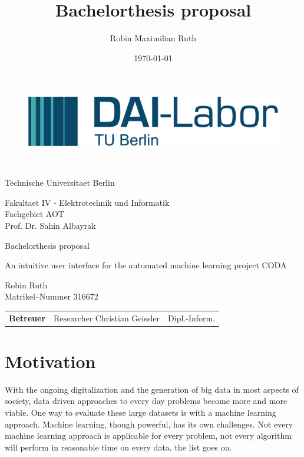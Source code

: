 \documentclass[12pt,a4paper,titlepage,oneside,BCOR1cm]{scrreprt}
\date{\today}
\author{Robin Maximilian Ruth}
\title{Bachelorthesis proposal}
\begin{document}
\thispagestyle{empty}

\begin{figure}[htbp]
\centering
 \begin{minipage}[b]{41 mm}
   \includegraphics[width=40 mm]{./figures/DAI_Logo.png}
 \end{minipage}
\end{figure}

~\vspace{0.5cm}

\begin{center}
\begin{Huge}
Technische Universitaet Berlin\\
\vspace{1mm}
\end{Huge}{\Large Fakultaet IV - Elektrotechnik und Informatik\\
Fachgebiet AOT\\
Prof. Dr. Sahin Albayrak}\\

\vspace{26mm}
\begin{LARGE}
Bachelorthesis proposal\\
\end{LARGE}
\vspace{8mm}
\begin{LARGE}
An intuitive user interface for the automated machine learning project CODA\\
\end{LARGE}
\vspace{3 cm}
Robin Ruth\\
Matrikel--Nummer 316672\\
\vspace{1cm}
\begin{tabular}{lll}
    \textbf{Betreuer} & Researcher Christian Geissler & Dipl.-Inform.\\
\end{tabular}


\end{center}

\tableofcontents
\thispagestyle{empty}


\chapter{Motivation}
With the ongoing digitalization and the generation of big data in most aspects of society, data driven approaches to every day problems become more and more viable. One way to evaluate these large datasets is with a machine learning approach. Machine learning, though powerful, has its own challenges. Not every machine learning approach is applicable for every problem, not every algorithm will perform in reasonable time on every data, the list goes on.
\end{document}
